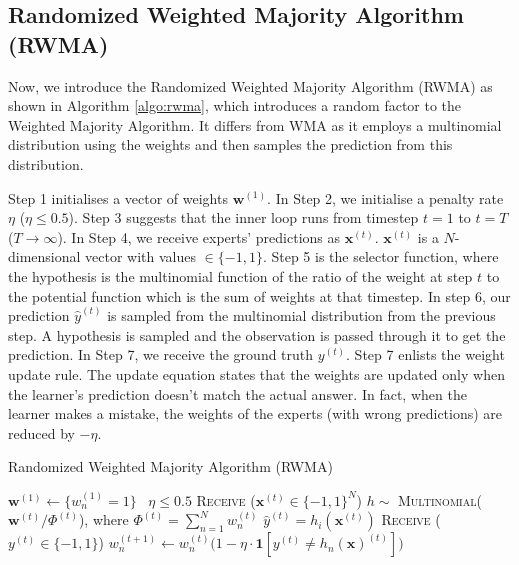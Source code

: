 \documentclass[11pt]{article}
\begin{document}
\subsection{Randomized Weighted Majority Algorithm (RWMA)}

Now, we introduce the Randomized Weighted Majority Algorithm (RWMA) as shown in Algorithm \ref{algo:rwma}, which introduces a random factor to the Weighted Majority Algorithm. It differs from WMA as it employs a multinomial distribution using the weights and then samples the prediction from this distribution.

Step 1 initialises a vector of weights $\textbf{w}^{(1)}$. In Step 2, we initialise a penalty rate $\eta$ ($\eta \leq 0.5$). Step 3 suggests that the inner loop runs from timestep $t=1$ to $t=T$ ($T \rightarrow \infty$).
In Step 4, we receive experts' predictions as $\textbf{x}^{(t)}$. $\textbf{x}^{(t)}$ is a $N$-dimensional vector with values $\in\{-1, 1\}$. Step 5 is the selector function, where the hypothesis is the multinomial function of the ratio of the weight at step $t$ to the potential function which is the sum of weights at that timestep. In step 6, our prediction $\hat{y}^{(t)}$ is sampled from the multinomial distribution from the previous step. A hypothesis is sampled and the observation is passed through it to get the prediction. In Step 7, we receive the ground truth  ${y}^{(t)}$. Step 7 enlists the weight update rule. The update equation states that the weights are updated only when the learner's prediction doesn't match the actual answer. In fact, when the learner makes a mistake, the weights of the experts (with wrong predictions) are reduced by $- \eta$. 

\begin{algorithm}[H]
\caption{Randomized Weighted Majority Algorithm (RWMA)}
\label{algo:rwma}
\begin{algorithmic}[1]
\STATE $\textbf{w}^{(1)} \leftarrow \{w_n^{(1)}=1\}$ \
\STATE $\eta\leq0.5$\hfill 
{}
\STATE \textsc{Receive} ($\textbf{x}^{(t)}\in\{-1, 1\}^N$) \hfill 
\STATE $h\sim$ \textsc{Multinomial}($\textbf{w}^{(t)}/\Phi^{(t)}$), where $\Phi^{(t)}=\sum_{n=1}^Nw_n^{(t)}$
\STATE $\hat{y}^{(t)}=h_i(\textbf{x}^{(t)})$ \hfill
\STATE \textsc{Receive} ($y^{(t)}\in \{-1,1\}$) \hfill 
\STATE $w_n^{(t+1)}\leftarrow w_n^{(t)}\big(1-\eta\cdot\textbf{1}[y^{(t)}\neq h_n(\textbf{x})^{(t)}]\big)$ \hfill 
\ENDFOR
\end{algorithmic}
\end{algorithm}
\end{document}
